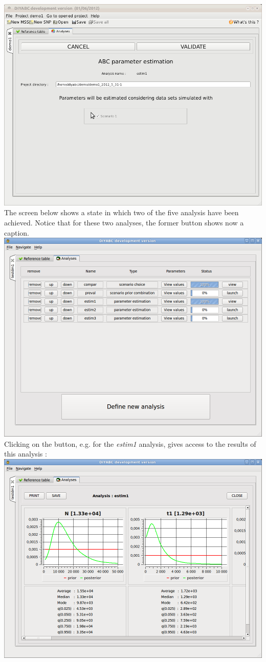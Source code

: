 \includegraphics[scale=0.3]{gui_pictures/Capture-DIYABC-35.png} 
 \vspace{20}
The screen below shows a state in which two of the five analysis have been achieved. Notice that for these two analyses, the former  button shows now a  caption. 
\includegraphics[scale=0.3]{gui_pictures/Capture-DIYABC-36.png} 
 \vspace{20}
Clicking on the  button, e.g. for the \emph{estim1} analysis, gives access to the results of this analysis :\\
\includegraphics[scale=0.3]{gui_pictures/Capture-DIYABC-37.png}
